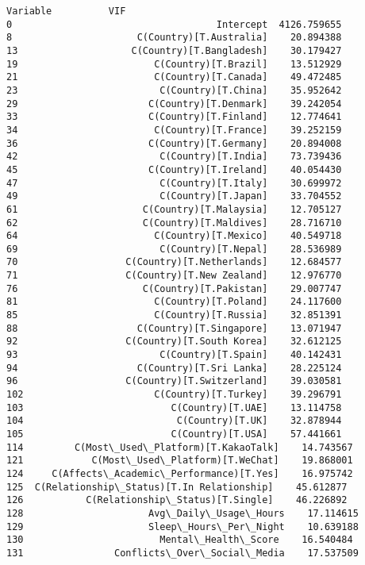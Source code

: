 \documentclass[11pt]{article}
\makeatletter
\newcommand{\boxspacing}{\kern\kvtcb@left@rule\kern\kvtcb@boxsep}
\newcommand{\prompt}[4]{
        {\ttfamily\llap{{\color{#2}[#3]:\hspace{3pt}#4}}\vspace{-\baselineskip}}
    }
\makeatother
\begin{document}
            \begin{tcolorbox}[breakable, size=fbox, boxrule=.5pt, pad at break*=1mm, opacityfill=0]
\prompt{Out}{outcolor}{7}{\boxspacing}
\begin{Verbatim}[commandchars=\\\{\}]
                                      Variable          VIF
0                                    Intercept  4126.759655
8                      C(Country)[T.Australia]    20.894388
13                    C(Country)[T.Bangladesh]    30.179427
19                        C(Country)[T.Brazil]    13.512929
21                        C(Country)[T.Canada]    49.472485
23                         C(Country)[T.China]    35.952642
29                       C(Country)[T.Denmark]    39.242054
33                       C(Country)[T.Finland]    12.774641
34                        C(Country)[T.France]    39.252159
36                       C(Country)[T.Germany]    20.894008
42                         C(Country)[T.India]    73.739436
45                       C(Country)[T.Ireland]    40.054430
47                         C(Country)[T.Italy]    30.699972
49                         C(Country)[T.Japan]    33.704552
61                      C(Country)[T.Malaysia]    12.705127
62                      C(Country)[T.Maldives]    28.716710
64                        C(Country)[T.Mexico]    40.549718
69                         C(Country)[T.Nepal]    28.536989
70                   C(Country)[T.Netherlands]    12.684577
71                   C(Country)[T.New Zealand]    12.976770
76                      C(Country)[T.Pakistan]    29.007747
81                        C(Country)[T.Poland]    24.117600
85                        C(Country)[T.Russia]    32.851391
88                     C(Country)[T.Singapore]    13.071947
92                   C(Country)[T.South Korea]    32.612125
93                         C(Country)[T.Spain]    40.142431
94                     C(Country)[T.Sri Lanka]    28.225124
96                   C(Country)[T.Switzerland]    39.030581
102                       C(Country)[T.Turkey]    39.296791
103                          C(Country)[T.UAE]    13.114758
104                           C(Country)[T.UK]    32.878944
105                          C(Country)[T.USA]    57.441661
114         C(Most\_Used\_Platform)[T.KakaoTalk]    14.743567
121            C(Most\_Used\_Platform)[T.WeChat]    19.868001
124     C(Affects\_Academic\_Performance)[T.Yes]    16.975742
125  C(Relationship\_Status)[T.In Relationship]    45.612877
126           C(Relationship\_Status)[T.Single]    46.226892
128                      Avg\_Daily\_Usage\_Hours    17.114615
129                      Sleep\_Hours\_Per\_Night    10.639188
130                        Mental\_Health\_Score    16.540484
131                Conflicts\_Over\_Social\_Media    17.537509
\end{Verbatim}
\end{tcolorbox}
        
\end{document}
